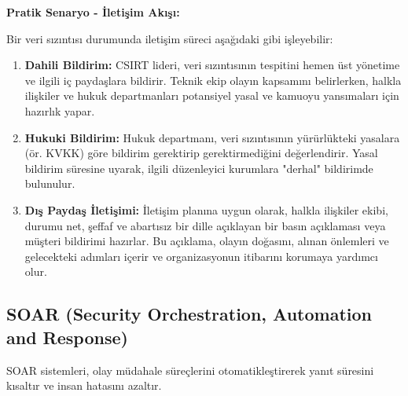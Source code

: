 \begin{itemize}
\begin{itemize}
\textbf{Pratik Senaryo - İletişim Akışı:}

Bir veri sızıntısı durumunda iletişim süreci aşağıdaki gibi işleyebilir:

\begin{enumerate}
    \item \textbf{Dahili Bildirim:} CSIRT lideri, veri sızıntısının tespitini hemen üst yönetime ve ilgili iç paydaşlara bildirir. Teknik ekip olayın kapsamını belirlerken, halkla ilişkiler ve hukuk departmanları potansiyel yasal ve kamuoyu yansımaları için hazırlık yapar.
    \item \textbf{Hukuki Bildirim:} Hukuk departmanı, veri sızıntısının yürürlükteki yasalara (ör. KVKK) göre bildirim gerektirip gerektirmediğini değerlendirir. Yasal bildirim süresine uyarak, ilgili düzenleyici kurumlara "derhal" bildirimde bulunulur.
    \item \textbf{Dış Paydaş İletişimi:} İletişim planına uygun olarak, halkla ilişkiler ekibi, durumu net, şeffaf ve abartısız bir dille açıklayan bir basın açıklaması veya müşteri bildirimi hazırlar. Bu açıklama, olayın doğasını, alınan önlemleri ve gelecekteki adımları içerir ve organizasyonun itibarını korumaya yardımcı olur.
\end{enumerate}

\subsection{SOAR (Security Orchestration, Automation and Response)}

SOAR sistemleri, olay müdahale süreçlerini otomatikleştirerek yanıt süresini kısaltır ve insan hatasını azaltır.


\end{itemize}
\end{itemize}
